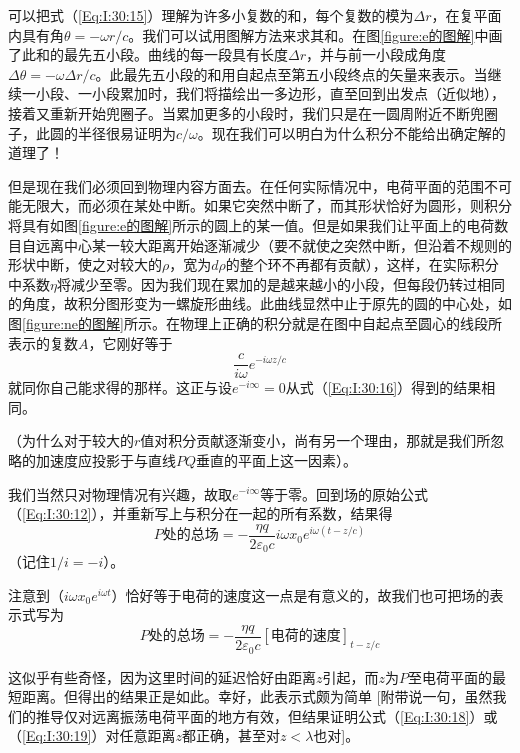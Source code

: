可以把式（\ref{Eq:I:30:15}）理解为许多小复数的和，每个复数的模为$\Delta r$，在复平面内具有角$\theta=-\omega r/c$。我们可以试用图解方法来求其和。在图\ref{figure:e的图解}中画了此和的最先五小段。曲线的每一段具有长度$\Delta r$，并与前一小段成角度$\Delta\theta=-\omega\Delta r/c$。此最先五小段的和用自起点至第五小段终点的矢量来表示。当继续一小段、一小段累加时，我们将描绘出一多边形，直至回到出发点（近似地），接着又重新开始兜圈子。当累加更多的小段时，我们只是在一圆周附近不断兜圈子，此圆的半径很易证明为$c/\omega$。现在我们可以明白为什么积分不能给出确定解的道理了！

但是现在我们必须回到物理内容方面去。在任何实际情况中，电荷平面的范围不可能无限大，而必须在某处中断。如果它突然中断了，而其形状恰好为圆形，则积分将具有如图\ref{figure:e的图解}所示的圆上的某一值。但是如果我们让平面上的电荷数目自远离中心某一较大距离开始逐渐减少（要不就使之突然中断，但沿着不规则的形状中断，使之对较大的$\rho$，宽为$d\rho$的整个环不再都有贡献），这样，在实际积分中系数$\eta$将减少至零。因为我们现在累加的是越来越小的小段，但每段仍转过相同的角度，故积分图形变为一螺旋形曲线。此曲线显然中止于原先的圆的中心处，如图\ref{figure:ne的图解}所示。在物理上正确的积分就是在图中自起点至圆心的线段所表示的复数$A$，它刚好等于
\begin{equation}
    \label{Eq:I:30:17}
    \frac{c}{i\omega}e^{-i\omega z/c}
\end{equation}
就同你自己能求得的那样。这正与设$e^{-i\infty}=0$从式（\ref{Eq:I:30:16}）得到的结果相同。

（为什么对于较大的$r$值对积分贡献逐渐变小，尚有另一个理由，那就是我们所忽略的加速度应投影于与直线$PQ$垂直的平面上这一因素）。

我们当然只对物理情况有兴趣，故取$e^{-i\infty}$等于零。回到场的原始公式（\ref{Eq:I:30:12}），并重新写上与积分在一起的所有系数，结果得
\begin{equation}
    \label{Eq:I:30:18}
    \text{$P$处的总场}=-\frac{\eta q}{2\varepsilon_0c}i\omega x_0e^{i\omega(t-z/c)}
\end{equation}
（记住$1/i=-i$）。

注意到（$i\omega x_0e^{i\omega t}$）恰好等于电荷的速度这一点是有意义的，故我们也可把场的表示式写为
\begin{equation}
    \label{Eq:I:30:19}
    \text{$P$处的总场}=-\frac{\eta q}{2\varepsilon_0c}[\text{电荷的速度}]_{t-z/c}
\end{equation}

这似乎有些奇怪，因为这里时间的延迟恰好由距离$z$引起，而$z$为$P$至电荷平面的最短距离。但得出的结果正是如此。幸好，此表示式颇为简单 [附带说一句，虽然我们的推导仅对远离振荡电荷平面的地方有效，但结果证明公式（\ref{Eq:I:30:18}）或（\ref{Eq:I:30:19}）对任意距离$z$都正确，甚至对$z<\lambda$也对]。